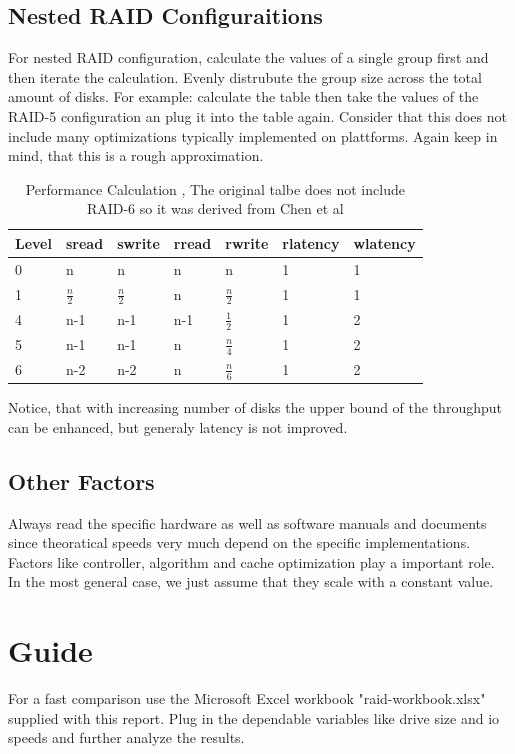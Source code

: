 \documentclass{article}
\begin{document}
\subsection{Nested RAID Configuraitions}
For nested RAID configuration, calculate the values of a single group first and
then iterate the calculation. Evenly distrubute the group size across
the total amount of disks.
For example: calculate the table then take
the values of the RAID-5 configuration an plug it into the table again.
Consider that this does not include many optimizations typically implemented
on plattforms.
Again keep in mind, that this is a rough approximation.
\begin{table}[h]
    \begin{tabularx}{\textwidth}{l|X|X|X|X|X|X}
        \textbf{Level} &
        sread &
        swrite &
        rread &
        rwrite &
        rlatency &
        wlatency \\
        \hline
        0 & n & n & n & n & 1 & 1\\
        1 & \( \frac{n}{2}\) & \( \frac{n}{2}\) & n & \( \frac{n}{2}\) & 1 & 1\\ 
        4 & n-1 & n-1 & n-1 & \( \frac{1}{2}\) & 1 & 2 \\ 
        5 & n-1 & n-1 & n & \( \frac{n}{4}\) & 1 & 2 \\
        6 & n-2 \cite{cmu:raidhighperf}& n-2 \cite{cmu:raidhighperf}& n \cite{cmu:raidhighperf}& \( \frac{n}{6} \) \cite{cmu:raidhighperf}& 1 \cite{cmu:raidhighperf}& 2 \cite{cmu:raidhighperf}\\
       \end{tabularx}
    \caption{Performance Calculation \cite{uw:raid}, The original talbe does not include RAID-6 so it was derived from Chen et al \cite{cmu:raidhighperf}}
    \label{tab:perf}
\end{table}

Notice, that with increasing number of disks
the upper bound of the throughput can be enhanced,
but generaly latency is not improved.
\subsection{Other Factors}
Always read the specific hardware as well as software manuals and documents since
theoratical speeds very much depend on the specific implementations.
Factors like controller, algorithm and cache optimization play a important role.
In the most general case, we just assume that they scale with a constant value.
\pagebreak
\section{Guide}
For a fast comparison use the Microsoft Excel workbook "raid-workbook.xlsx"
supplied with this report. Plug in the dependable variables like drive size
and io speeds and further analyze the results.
\end{document}
